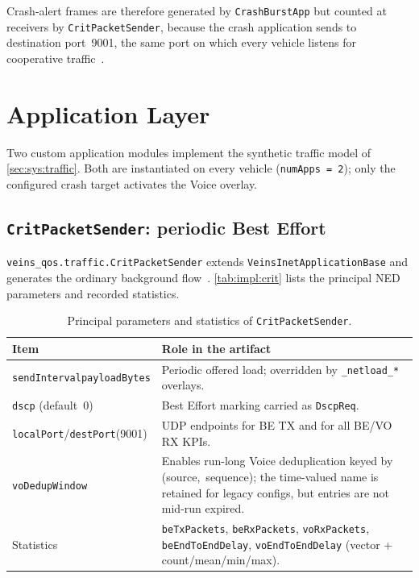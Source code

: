 Crash-alert frames are therefore generated by \texttt{CrashBurstApp} but counted at receivers by \texttt{CritPacketSender}, because the crash application sends to destination port~9001, the same port on which every vehicle listens for cooperative traffic~\cite{aguiar2026_veins_qos}.

\section{Application Layer}
\label{sec:impl:apps}

Two custom application modules implement the synthetic traffic model of \autoref{sec:sys:traffic}.
Both are instantiated on every vehicle (\texttt{numApps = 2}); only the configured crash target activates the Voice overlay.

\subsection{\texttt{CritPacketSender}: periodic Best Effort}
\label{sec:impl:crit}

\texttt{veins\_qos.traffic.CritPacketSender} extends \texttt{VeinsInetApplicationBase} and generates the ordinary background flow~\cite{aguiar2026_veins_qos}.
\autoref{tab:impl:crit} lists the principal NED parameters and recorded statistics.

\begin{table}[htb]
	\ABNTEXfontereduzida
	\caption{\label{tab:impl:crit}Principal parameters and statistics of \texttt{CritPacketSender}.}
	\begin{center}
		\begin{tabularx}{\linewidth}{@{}>{\raggedright\arraybackslash}p{4.2cm} >{\raggedright\arraybackslash}X@{}}
			\toprule
			\textbf{Item} & \textbf{Role in the artifact} \\
			\midrule
			\texttt{sendInterval}\newline\texttt{payloadBytes} &
			  Periodic offered load; overridden by \texttt{\_netload\_*} overlays. \\
			\addlinespace
			\texttt{dscp} (default~0) &
			  Best Effort marking carried as \texttt{DscpReq}. \\
			\addlinespace
			\texttt{localPort}/\texttt{destPort}\newline(9001) &
			  UDP endpoints for BE TX and for all BE/VO RX KPIs. \\
			\addlinespace
			\texttt{voDedupWindow} &
			  Enables run-long Voice deduplication keyed by (source,~sequence); the time-valued name is retained for legacy configs, but entries are not mid-run expired. \\
			\addlinespace
			Statistics &
			  \texttt{beTxPackets}, \texttt{beRxPackets}, \texttt{voRxPackets}, \texttt{beEndToEndDelay}, \texttt{voEndToEndDelay} (vector + count/mean/min/max). \\
			\bottomrule
		\end{tabularx}
	\end{center}
\end{table}

